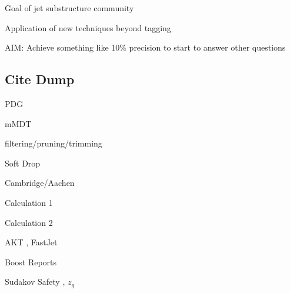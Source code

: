 
Goal of jet substructure community

Application of new techniques beyond tagging

AIM:  Achieve something like 10\% precision to start to answer other questions

\subsection{Cite Dump}

PDG \cite{Olive:2016xmw}

mMDT \cite{Dasgupta:2013ihk,Dasgupta:2013via}

filtering/pruning/trimming \cite{Butterworth:2008iy,Ellis:2009su,Ellis:2009me,Krohn:2009th}

Soft Drop \cite{Larkoski:2014wba}

Cambridge/Aachen \cite{Wobisch:1998wt,Dokshitzer:1997in}

Calculation 1 \cite{Frye:2016okc,Frye:2016aiz}

Calculation 2 \cite{Marzani:2017mva}

AKT \cite{Cacciari:2008gp}, FastJet \cite{Cacciari:2011ma}

Boost Reports \cite{Abdesselam:2010pt,Altheimer:2012mn,Altheimer:2013yza,Adams:2015hiv}

Sudakov Safety \cite{Larkoski:2013paa,Larkoski:2015lea}, $z_g$ \cite{Larkoski:2015lea}
